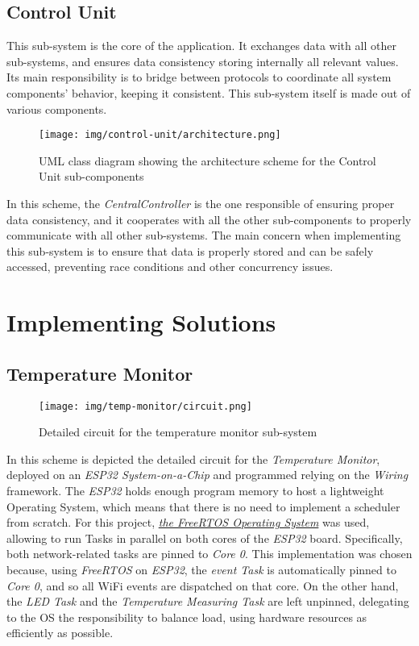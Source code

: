 \documentclass[a4paper,12pt]{report}
\begin{document}
	\section{Control Unit}
	This sub-system is the core of the application. It exchanges data with all other sub-systems, and ensures data consistency storing internally all relevant values. Its main responsibility is to bridge between protocols to coordinate all system components' behavior, keeping it consistent.
	\newline This sub-system itself is made out of various components.
	\begin{figure}[H]
		\centering{}
		\texttt{[image: img/control-unit/architecture.png]}
		\caption{UML class diagram showing the architecture scheme for the Control Unit sub-components}
		\label{img:control-unit/architecture}
	\end{figure}
	In this scheme, the \textit{CentralController} is the one responsible of ensuring proper data consistency, and it cooperates with all the other sub-components to properly communicate with all other sub-systems. The main concern when implementing this sub-system is to ensure that data is properly stored and can be safely accessed, preventing race conditions and other concurrency issues.
	
	\chapter{Implementing Solutions}
	\section{Temperature Monitor}
	\begin{figure}[H]
		\centering{}
		\texttt{[image: img/temp-monitor/circuit.png]}
		\caption{Detailed circuit for the temperature monitor sub-system}
		\label{img:temp-monitor/circuit}
	\end{figure}
	In this scheme is depicted the detailed circuit for the \textit{Temperature Monitor}, deployed on an \textit{ESP32 System-on-a-Chip} and programmed relying on the \textit{Wiring} framework.
	\newline The \textit{ESP32} holds enough program memory to host a lightweight Operating System, which means that there is no need to implement a scheduler from scratch. For this project, \href{https://www.freertos.org/}{\textit{the FreeRTOS Operating System}} was used, allowing to run Tasks in parallel on both cores of the \textit{ESP32} board.
	\newline Specifically, both network-related tasks are pinned to \textit{Core 0}. This implementation was chosen because, using \textit{FreeRTOS} on \textit{ESP32}, the \textit{event Task} is automatically pinned to \textit{Core 0}, and so all WiFi events are dispatched on that core. On the other hand, the \textit{LED Task} and the \textit{Temperature Measuring Task} are left unpinned, delegating to the OS the responsibility to balance load, using hardware resources as efficiently as possible.
\end{document}
